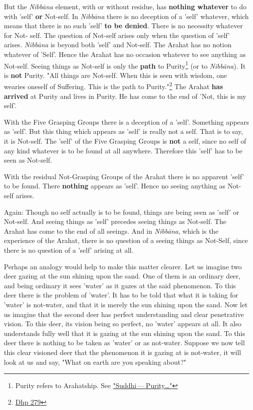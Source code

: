 But the \emph{Nibbāna} element, with or without residue, has \textbf{nothing whatever}
to do with 'self' \textbf{or} Not-self. In \emph{Nibbāna} there is no
deception of a 'self' whatever, which means that there is no such 'self'
\textbf{to be denied}. There is no necessity whatever for Not- self. The
question of Not-self arises only when the question of 'self' arises.
\emph{Nibbāna} is beyond both 'self' and Not-self. The Arahat has no notion
whatever of 'Self'. Hence the Arahat has no occasion whatever to see
anything as Not-self. Seeing things as Not-self is only the \textbf{path} to
Purity\footnote{Purity refers to Arahatship. See \hyperlink{suddhi}{"Suddhi — Purity…​"}} (or to
\emph{Nibbāna}). It is \textbf{not} Purity. "All things are Not-self. When this is
seen with wisdom, one wearies oneself of Suffering. This is the path to
Purity."\footnote{\href{https://suttacentral.net/dhp273-289/en/anandajoti}{Dhp 279}}
The Arahat \textbf{has arrived} at Purity and lives in Purity.
He has come to the end of 'Not, this is my self'.


With the Five Grasping Groups there is a deception of a 'self'.
Something appears as 'self'. But this thing which appears as 'self' is
really not a self. That is to say, it is Not-self. The 'self' of the
Five Grasping Groups is \textbf{not} a self, since no self of any kind whatever
is to be found at all anywhere. Therefore this 'self' has to be seen as
Not-self.


With the residual Not-Grasping Groups of the Arahat there is no apparent
'self' to be found. There \textbf{nothing} appears as 'self'. Hence no seeing
anything as Not-self arises.


Again: Though no self actually is to be found, things are being seen as
'self' or Not-self. And seeing things as 'self' precedes seeing things
as Not-self. The Arahat has come to the end of all seeings. And in
\emph{Nibbāna}, which is the experience of the Arahat, there is no question
of a seeing things as Not-Self, since there is no question of a 'self'
arising at all.


Perhaps an analogy would help to make this matter clearer. Let us
imagine two deer gazing at the sun shining upon the sand. One of them is
an ordinary deer, and being ordinary it sees 'water' as it gazes at the
said phenomenon. To this deer there is the problem of 'water'. It has to
be told that what it is taking for 'water' is not-water, and that it is
merely the sun shining upon the sand. Now let us imagine that the second
deer has perfect understanding and clear penetrative vision. To this
deer, its vision being so perfect, no 'water' appears at all. It also
understands fully well that it is gazing at the sun shining upon the
sand. To this deer there is nothing to be taken as 'water' or as
not-water. Suppose we now tell this clear visioned deer that the
phenomenon it is gazing at is not-water, it will look at us and say,
"What on earth are you speaking about?"


